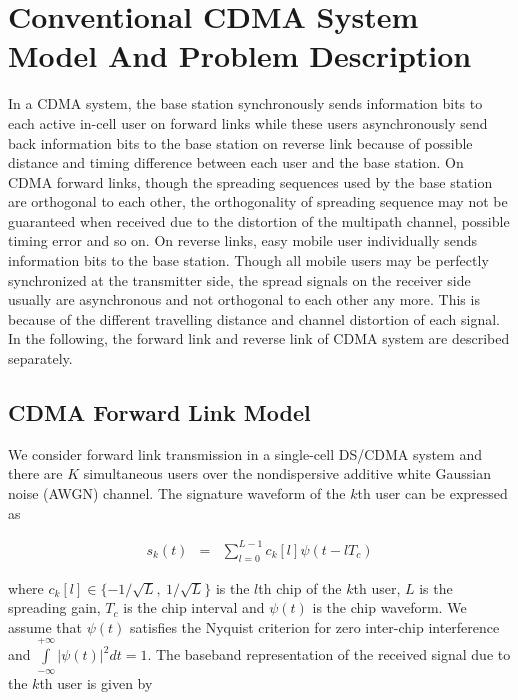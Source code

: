 \documentclass[a4paper,11pt,fleqn]{article}
\begin{document}
\pagebreak

\section{Conventional CDMA System Model And Problem Description}

In a CDMA system, the base station synchronously sends information
bits to each active in-cell user on forward links while these
users asynchronously send back information bits to the base
station on reverse link because of possible distance and timing
difference between each user and the base station. On CDMA forward
links, though the spreading sequences used by the base station are
orthogonal to each other, the orthogonality of spreading sequence
may not be guaranteed when received due to the distortion of the
multipath channel, possible timing error and so on. On reverse
links, easy mobile user individually sends information bits to the
base station. Though all mobile users may be perfectly
synchronized at the transmitter side, the spread signals on the
receiver side usually are asynchronous
 and not orthogonal to each other any more. This is because of the different travelling distance and channel distortion of each signal. In the following, the forward link and
 reverse link of CDMA system are described separately.

\subsection{CDMA Forward Link Model}

We consider forward link transmission in a single-cell DS/CDMA
system and there are $K$ simultaneous users  over the
nondispersive additive white Gaussian noise (AWGN) channel. The
signature waveform of the $k$th user can be expressed as

\begin{equation}
\begin{array}{rcl}
s_k(t)&=&\sum\limits_{l=0}^{L-1}c_k[l]\psi(t-lT_c)
\end{array}
\end{equation}

\noindent where $c_k[l]\in \{-1/\sqrt{L},\ 1/\sqrt{L}\}$ is the
$l$th chip of the $k$th user, $L$ is the spreading gain, $T_c$ is
the chip interval and $\psi(t)$ is the chip waveform. We assume
that $\psi(t)$ satisfies the Nyquist criterion for zero inter-chip
interference and $\int\limits_{-\infty}^{+\infty}|\psi(t)|^2dt=1$.
The baseband representation of the received signal due to the
$k$th user is given by
\end{document}
